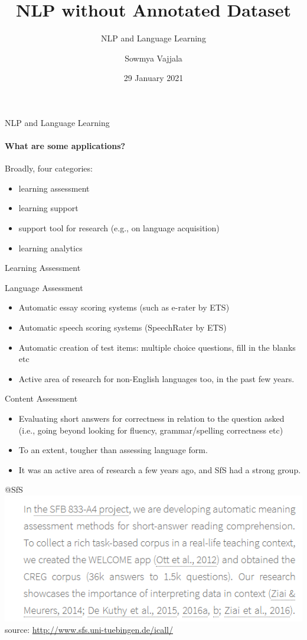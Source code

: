 \documentclass{beamer}
\author[Sowmya Vajjala]{Sowmya Vajjala}
\title[SfSNLP]{NLP without Annotated Dataset}
\subtitle{NLP and Language Learning}
\date{29 January 2021}
\institute{Seminar f\"ur Sprachwissenschaft, University of T\"ubingen, Germany}
\begin{document}
\begin{frame}\titlepage
\end{frame}

\begin{frame}{NLP and Language Learning}
\framesubtitle{What are some applications?}
Broadly, four categories:
\begin{itemize}
    \item learning assessment
    \item learning support
    \item support tool for research (e.g., on language acquisition)
    \item learning analytics
\end{itemize}
\end{frame}

\begin{frame}{}
    \Large Learning Assessment
\end{frame}

\begin{frame}{Language Assessment}
    \begin{itemize}
        \item Automatic essay scoring systems (such as e-rater by ETS)
        \item Automatic speech scoring systems (SpeechRater by ETS)
        \item Automatic creation of test items: multiple choice questions, fill in the blanks etc 
        \item Active area of research for non-English languages too, in the past few years. 
    \end{itemize}
\end{frame}

\begin{frame}{Content Assessment}
    \begin{itemize}
        \item Evaluating short answers for correctness in relation to the question asked (i.e., going beyond looking for fluency, grammar/spelling correctness etc)
        \item To an extent, tougher than assessing language form. 
        \item It was an active area of research a few years ago, and SfS had a strong group. 
    \end{itemize}
\end{frame}

\begin{frame}{@SfS}
    \includegraphics[width=\textwidth]{figures/sfs1.PNG}
    source: \url{http://www.sfs.uni-tuebingen.de/icall/}
\end{frame}
\end{document}
